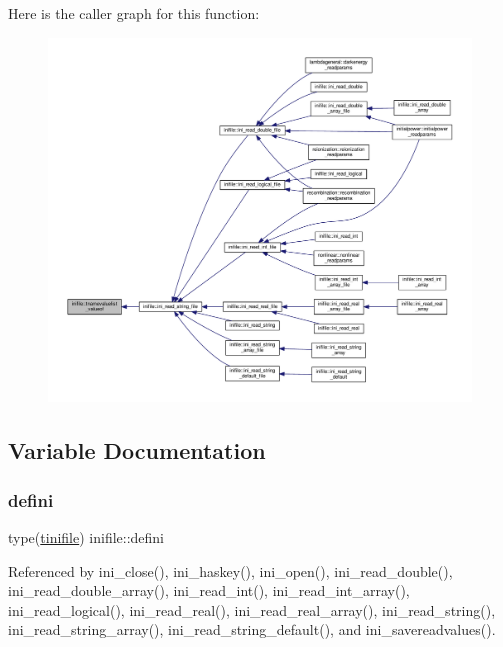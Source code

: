 Here is the caller graph for this function\+:
\nopagebreak
\begin{figure}[H]
\begin{center}
\leavevmode
\includegraphics[width=350pt]{namespaceinifile_a7381759693093e431b8e0aabf6e4b0f2_icgraph}
\end{center}
\end{figure}


\subsection{Variable Documentation}
\mbox{\label{namespaceinifile_aba287d83fd6e9c158ca1906470148d9d}} 
\subsubsection{\texorpdfstring{defini}{defini}}
{\footnotesize\ttfamily type(\mbox{\hyperlink{structinifile_1_1tinifile}{tinifile}}) inifile\+::defini}



Referenced by ini\+\_\+close(), ini\+\_\+haskey(), ini\+\_\+open(), ini\+\_\+read\+\_\+double(), ini\+\_\+read\+\_\+double\+\_\+array(), ini\+\_\+read\+\_\+int(), ini\+\_\+read\+\_\+int\+\_\+array(), ini\+\_\+read\+\_\+logical(), ini\+\_\+read\+\_\+real(), ini\+\_\+read\+\_\+real\+\_\+array(), ini\+\_\+read\+\_\+string(), ini\+\_\+read\+\_\+string\+\_\+array(), ini\+\_\+read\+\_\+string\+\_\+default(), and ini\+\_\+savereadvalues().

